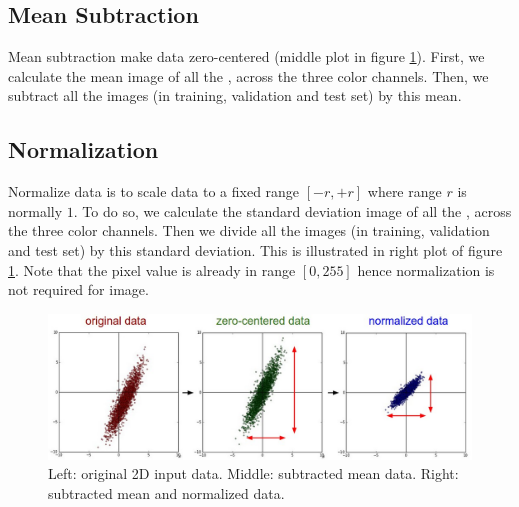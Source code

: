\subsection{Mean Subtraction}
Mean subtraction make data zero-centered (middle plot in figure \ref{fig:prepro1}). First, we calculate the mean image of all the , across the three color channels. Then, we subtract all the images (in training, validation and test set) by this mean. 
\subsection{Normalization}
Normalize data is to scale data to a fixed range $[-r, +r]$ where range $r$ is normally $1$. To do so, we calculate the standard deviation image of all the , across the three color channels. Then we divide all the images (in training, validation and test set) by this standard deviation. This is illustrated in right plot of figure \ref{fig:prepro1}. Note that the pixel value is already in range $[0, 255]$ hence normalization is not required for image.

\begin{figure}[tb]
	\centering
	\includegraphics[width=0.9\hsize]{./figures/prepro1}
	\caption{Left: original 2D input data. Middle: subtracted mean data. Right: subtracted mean and normalized data. }
	\label{fig:prepro1}
\end{figure}

